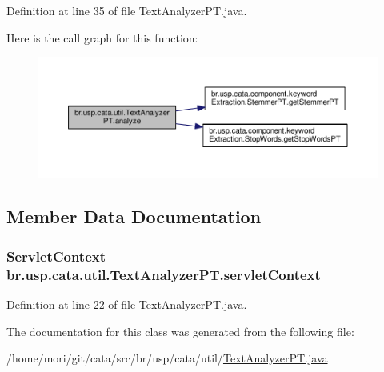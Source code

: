 Definition at line 35 of file Text\+Analyzer\+P\+T.\+java.



Here is the call graph for this function\+:\nopagebreak
\begin{figure}[H]
\begin{center}
\leavevmode
\includegraphics[width=350pt]{classbr_1_1usp_1_1cata_1_1util_1_1_text_analyzer_p_t_aa55f7b6703402d9cb9dd40abb915622b_cgraph}
\end{center}
\end{figure}




\subsection{Member Data Documentation}
\hypertarget{classbr_1_1usp_1_1cata_1_1util_1_1_text_analyzer_p_t_a06e2cb17d3b876c720abc8f3d231f354}{
\subsubsection[{servlet\+Context}]{\setlength{\rightskip}{0pt plus 5cm}Servlet\+Context br.\+usp.\+cata.\+util.\+Text\+Analyzer\+P\+T.\+servlet\+Context\hspace{0.3cm}{\ttfamily [package]}}}\label{classbr_1_1usp_1_1cata_1_1util_1_1_text_analyzer_p_t_a06e2cb17d3b876c720abc8f3d231f354}


Definition at line 22 of file Text\+Analyzer\+P\+T.\+java.



The documentation for this class was generated from the following file\+:\begin{DoxyCompactItemize}
\item 
/home/mori/git/cata/src/br/usp/cata/util/\hyperlink{_text_analyzer_p_t_8java}{Text\+Analyzer\+P\+T.\+java}\end{DoxyCompactItemize}
